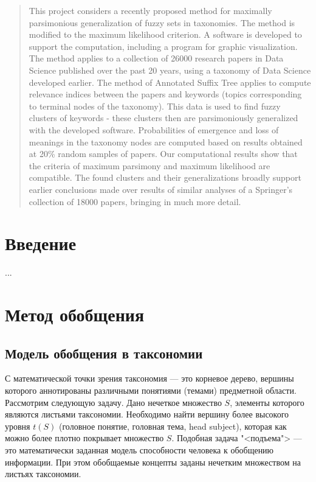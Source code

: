 \documentclass[12pt]{article}
\let\oldsection\section
\let\oldsubsection\subsection
\renewcommand{\section}{\clearpage\oldsection}
\renewcommand{\subsection}{\clearpage\oldsubsection}
\begin{document}
\begin{abstract}
	This project considers a recently proposed method for maximally parsimonious generalization of fuzzy sets in taxonomies. The method is modified to the maximum likelihood criterion. A software is developed to support the computation, including a program for graphic visualization. The method applies to a collection of 26000 research papers in Data Science published over the past 20 years, using a taxonomy of Data Science developed earlier.   The method of Annotated Suffix Tree applies to compute relevance indices between the papers and keywords (topics corresponding to terminal nodes of the taxonomy). This data is used to find fuzzy clusters of keywords - these clusters then are parsimoniously generalized with the developed software. Probabilities of emergence and loss of meanings in the taxonomy nodes are computed based on results obtained at 20\% random samples of papers. Our computational results show that the criteria of maximum parsimony and maximum likelihood are compatible. The found clusters and their generalizations broadly support earlier conclusions made over results of similar analyses of a Springer's collection of 18000 papers, bringing in much more detail.
\end{abstract}
\newpage

\setcounter{page}{1}
\tableofcontents
\newpage

\section{Введение}
...

\section{Метод обобщения}

\oldsubsection{Модель обобщения в таксономии}

С математической точки зрения таксономия --- это корневое дерево, вершины которого аннотированы различными понятиями (темами) предметной области. Рассмотрим следующую задачу. Дано нечеткое множество $S$, элементы которого являются листьями таксономии. Необходимо найти вершину более высокого уровня $t(S)$ (головное понятие, головная тема, head subject), которая как можно более плотно покрывает множество $S$. Подобная задача "<подъема"> --- это математически заданная модель способности человека к обобщению информации. При этом обобщаемые концепты заданы нечетким множеством на листьях таксономии.
\end{document}

